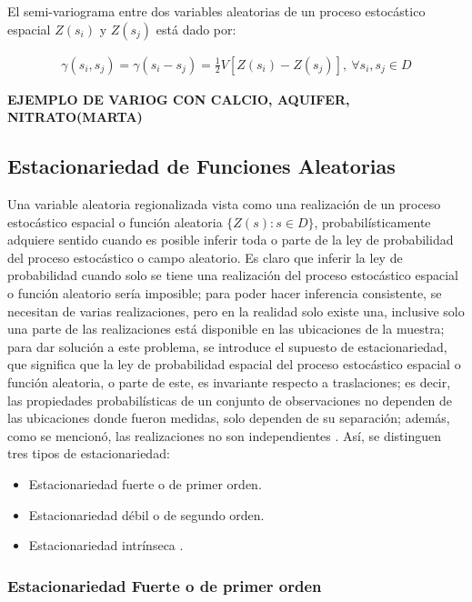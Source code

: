 \documentclass[
]{book}
\providecommand{\tightlist}{%
  \setlength{\itemsep}{0pt}\setlength{\parskip}{0pt}}
\begin{document}
El semi-variograma entre dos variables aleatorias de un proceso estocástico espacial \(Z(s_i)\) y \(Z(s_j)\) está dado por:

\begin{align*}
  \gamma(s_i,s_j)=\gamma(s_i-s_j)= \frac{1}{2} V[Z(s_i)-Z(s_j)], \ \forall s_i,s_j \in D 
\end{align*}

\textbf{EJEMPLO DE VARIOG CON CALCIO, AQUIFER, NITRATO(MARTA)}

\hypertarget{estacionariedad-de-funciones-aleatorias}{%
\subsection{Estacionariedad de Funciones Aleatorias}\label{estacionariedad-de-funciones-aleatorias}}

Una variable aleatoria regionalizada vista como una realización de un proceso estocástico espacial o función aleatoria \(\{Z(s):s\in D\}\), probabilísticamente adquiere sentido cuando es posible inferir toda o parte de la ley de probabilidad del proceso estocástico o campo aleatorio. Es claro que inferir la ley de probabilidad cuando solo se tiene una realización del proceso estocástico espacial o función aleatorio sería imposible; para poder hacer inferencia consistente, se necesitan de varias realizaciones, pero en la realidad solo existe una, inclusive solo una parte de las realizaciones está disponible en las ubicaciones de la muestra; para dar solución a este problema, se introduce el supuesto de estacionariedad, que significa que la ley de probabilidad espacial del proceso estocástico espacial o función aleatoria, o parte de este, es invariante respecto a traslaciones; es decir, las propiedades probabilísticas de un conjunto de observaciones no dependen de las ubicaciones donde fueron medidas, solo dependen de su separación; además, como se mencionó, las realizaciones no son independientes \citep{montero}. Así, se distinguen tres tipos de estacionariedad:

\begin{itemize}
\tightlist
\item
  Estacionariedad fuerte o de primer orden.
\item
  Estacionariedad débil o de segundo orden.
\item
  Estacionariedad intrínseca .
\end{itemize}

\hypertarget{estacionariedad-fuerte-o-de-primer-orden}{%
\subsubsection*{Estacionariedad Fuerte o de primer orden}\label{estacionariedad-fuerte-o-de-primer-orden}}
\end{document}
